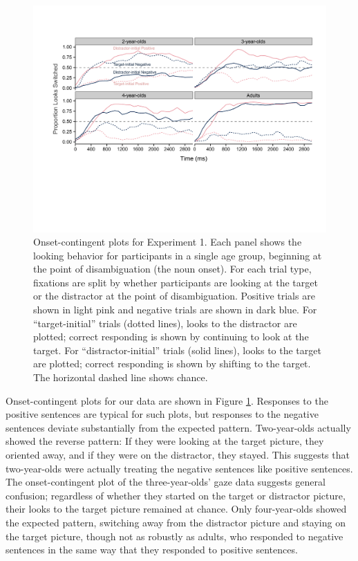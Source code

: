 \documentclass[man]{apa2}
\begin{document}
\begin{figure}
\begin{center} 
\includegraphics[width=6in]{OC_nothing.pdf}
\caption{\label{fig:e1split} Onset-contingent plots for Experiment 1. Each panel shows the looking behavior for participants in a single age group, beginning at the point of disambiguation (the noun onset). For each trial type, fixations are split by whether participants are looking at the target or the distractor at the point of disambiguation. Positive trials are shown in light pink and negative trials are shown in dark blue. For ``target-initial'' trials (dotted lines), looks to the distractor are plotted; correct responding is shown by continuing to look at the target. For ``distractor-initial'' trials (solid lines), looks to the target are plotted; correct responding is shown by shifting to the target. The horizontal dashed line shows chance.}
\end{center} 
\end{figure}

Onset-contingent plots for our data are shown in Figure \ref{fig:e1split}. Responses to the positive sentences are typical for such plots, but responses to the negative sentences deviate substantially from the expected pattern.  Two-year-olds actually showed the reverse pattern: If they were looking at the target picture, they oriented away, and if they were on the distractor, they stayed.  This suggests that two-year-olds were actually treating the negative sentences like positive sentences.  The onset-contingent plot of the three-year-olds' gaze data suggests general confusion; regardless of whether they started on the target or distractor picture, their looks to the target picture remained at chance.  Only four-year-olds showed the expected pattern, switching away from the distractor picture and staying on the target picture, though not as robustly as adults, who responded to negative sentences in the same way that they responded to positive sentences.  
\end{document}
